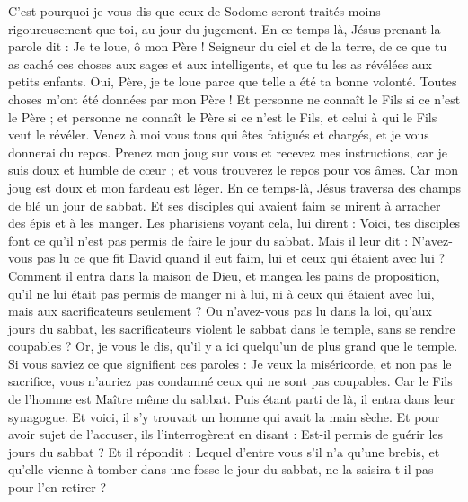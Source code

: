 \begin{multicols}{2}
C'est pourquoi je vous dis que ceux de Sodome seront traités moins rigoureusement que toi, au jour du jugement.
En ce temps-là, Jésus prenant la parole dit : Je te loue, ô mon Père ! Seigneur du ciel et de la terre, de ce que tu as caché ces choses aux sages et aux intelligents, et que tu les as révélées aux petits enfants.
Oui, Père, je te loue parce que telle a été ta bonne volonté.
Toutes choses m'ont été données par mon Père ! Et personne ne connaît le Fils si ce n'est le Père ; et personne ne connaît le Père si ce n'est le Fils, et celui à qui le Fils veut le révéler.
Venez à moi vous tous qui êtes fatigués et chargés, et je vous donnerai du repos.
Prenez mon joug sur vous et recevez mes instructions, car je suis doux et humble de cœur ; et vous trouverez le repos pour vos âmes.
Car mon joug est doux et mon fardeau est léger.
\VerseOne{}En ce temps-là, Jésus traversa des champs de blé un jour de sabbat. Et ses disciples qui avaient faim se mirent à arracher des épis et à les manger.
Les pharisiens voyant cela, lui dirent : Voici, tes disciples font ce qu'il n'est pas permis de faire le jour du sabbat.
Mais il leur dit : N'avez-vous pas lu ce que fit David quand il eut faim, lui et ceux qui étaient avec lui ?
Comment il entra dans la maison de Dieu, et mangea les pains de proposition, qu'il ne lui était pas permis de manger ni à lui, ni à ceux qui étaient avec lui, mais aux sacrificateurs seulement ?
Ou n'avez-vous pas lu dans la loi, qu'aux jours du sabbat, les sacrificateurs violent le sabbat dans le temple, sans se rendre coupables ?
Or, je vous le dis, qu'il y a ici quelqu'un de plus grand que le temple.
Si vous saviez ce que signifient ces paroles : Je veux la miséricorde, et non pas le sacrifice, vous n'auriez pas condamné ceux qui ne sont pas coupables.
Car le Fils de l'homme est Maître même du sabbat.
Puis étant parti de là, il entra dans leur synagogue.
Et voici, il s'y trouvait un homme qui avait la main sèche. Et pour avoir sujet de l'accuser, ils l'interrogèrent en disant : Est-il permis de guérir les jours du sabbat ?
Et il répondit : Lequel d'entre vous s'il n'a qu'une brebis, et qu'elle vienne à tomber dans une fosse le jour du sabbat, ne la saisira-t-il pas pour l'en retirer ?

\end{multicols}
